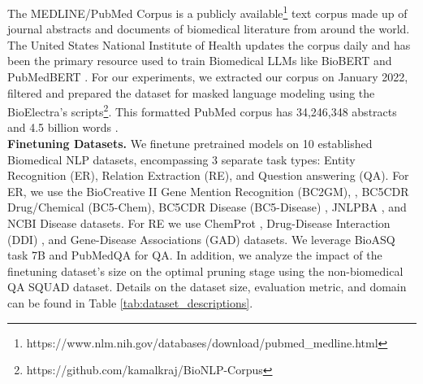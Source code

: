 \documentclass[10pt]{article}
\begin{document}
The MEDLINE/PubMed Corpus is a publicly available\footnote{https://www.nlm.nih.gov/databases/download/pubmed\_medline.html} text corpus made up of journal abstracts and documents of biomedical literature from around the world. The United States National Institute of Health updates the corpus daily and has been the primary resource used to train Biomedical LLMs like BioBERT \cite{Lee2020BioBERTAP} and PubMedBERT \cite{Gu2022DomainSpecificLM}. For our experiments, we extracted our corpus on January 2022, filtered and prepared the dataset for masked language modeling using the BioElectra's \cite{Kanakarajan2021BioELECTRAPretrainedBT} scripts\footnote{https://github.com/kamalkraj/BioNLP-Corpus}. This formatted PubMed corpus has 34,246,348 abstracts and 4.5 billion words \cite{Kanakarajan2021BioELECTRAPretrainedBT}. \\
\textbf{Finetuning Datasets.} We finetune pretrained models on 10 established Biomedical NLP datasets, encompassing 3 separate task types: Entity Recognition (ER), Relation Extraction (RE), and Question answering (QA). For ER, we use the BioCreative II Gene Mention Recognition (BC2GM), \cite{Smith2008OverviewOB}, BC5CDR Drug/Chemical (BC5-Chem), BC5CDR Disease (BC5-Disease) \cite{Li2016BioCreativeVC}, JNLPBA \cite{Collier2004IntroductionTT}, and NCBI Disease \cite{Dogan2014NCBIDC} datasets. For RE we use ChemProt \cite{Taboureau2011ChemProtAD}, Drug-Disease Interaction (DDI) \cite{HerreroZazo2013TheDC}, and Gene-Disease Associations (GAD) \cite{Becker2004TheGA} datasets. We leverage BioASQ task 7B \cite{Baker2016AutomaticSC} and PubMedQA \cite{Jin2019PubMedQAAD} for QA. In addition, we analyze the impact of the finetuning dataset's size on the optimal pruning stage using the non-biomedical QA SQUAD \cite{Rajpurkar2016SQuAD1Q} dataset. Details on the dataset size, evaluation metric, and domain can be found in Table \ref{tab:dataset_descriptions}.\\
\end{document}
